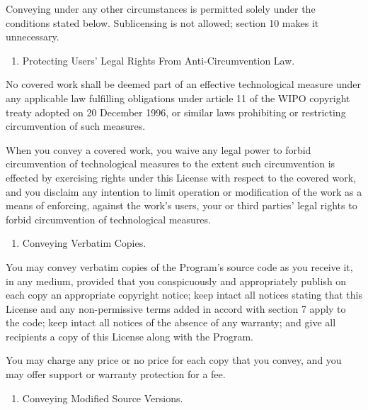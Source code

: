 \documentclass[letterpaper,10pt,english]{sphinxmanual}
\begin{document}
Conveying under any other circumstances is permitted solely under
the conditions stated below.  Sublicensing is not allowed; section 10
makes it unnecessary.
\begin{enumerate}
%
\setcounter{enumi}{2}
\item {} 
Protecting Users’ Legal Rights From Anti-Circumvention Law.

\end{enumerate}

No covered work shall be deemed part of an effective technological
measure under any applicable law fulfilling obligations under article
11 of the WIPO copyright treaty adopted on 20 December 1996, or
similar laws prohibiting or restricting circumvention of such
measures.

When you convey a covered work, you waive any legal power to forbid
circumvention of technological measures to the extent such circumvention
is effected by exercising rights under this License with respect to
the covered work, and you disclaim any intention to limit operation or
modification of the work as a means of enforcing, against the work’s
users, your or third parties’ legal rights to forbid circumvention of
technological measures.
\begin{enumerate}
%
\setcounter{enumi}{3}
\item {} 
Conveying Verbatim Copies.

\end{enumerate}

You may convey verbatim copies of the Program’s source code as you
receive it, in any medium, provided that you conspicuously and
appropriately publish on each copy an appropriate copyright notice;
keep intact all notices stating that this License and any
non-permissive terms added in accord with section 7 apply to the code;
keep intact all notices of the absence of any warranty; and give all
recipients a copy of this License along with the Program.

You may charge any price or no price for each copy that you convey,
and you may offer support or warranty protection for a fee.
\begin{enumerate}
%
\setcounter{enumi}{4}
\item {} 
Conveying Modified Source Versions.

\end{enumerate}
\end{document}
